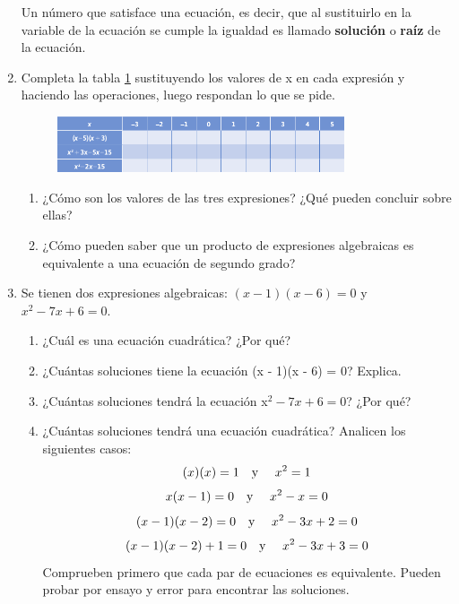 \documentclass[11pt]{book}
\begin{document}
\begin{enumerate}
\begin{enumerate}
        \end{enumerate}
        \begin{boxH}
          Un número que satisface una ecuación, es decir, que al sustituirlo en la variable de
          la ecuación se cumple la igualdad es llamado \textbf{solución} o \textbf{raíz} de la ecuación.
        \end{boxH}

        \newpage

  \item Completa la tabla \ref{tab:table01} sustituyendo los valores de x en cada expresión y haciendo las operaciones, luego respondan lo que se pide.

        \begin{figure}[H]
          \centering
          \includegraphics[width=0.8\textwidth]{tabla01.png}
          \label{tab:table01}
        \end{figure}

        \begin{enumerate}
          \item ¿Cómo son los valores de las tres expresiones? ¿Qué pueden concluir sobre ellas?
          \item ¿Cómo pueden saber que un producto de expresiones algebraicas es equivalente a una ecuación de segundo grado?
        \end{enumerate}


  \item Se tienen dos expresiones algebraicas: $(x - 1)(x - 6) = 0$ y $x^2 - 7x + 6 = 0$.

        \begin{enumerate}
          \item ¿Cuál es una ecuación cuadrática? ¿Por qué?
          \item ¿Cuántas soluciones tiene la ecuación (x - 1)(x - 6) = 0? Explica.
          \item ¿Cuántas soluciones tendrá la ecuación x$^2 - 7x + 6 = 0$? ¿Por qué?
          \item ¿Cuántas soluciones tendrá una ecuación cuadrática?
                Analicen los siguientes casos:
                \[(x)(x) = 1 \text{\quad y \quad} x^2 = 1\]
                \[x(x - 1) = 0 \text{\quad y \quad}x^2 - x = 0\]
                \[(x - 1)(x - 2) = 0 \text{\quad y \quad} x^2 - 3x + 2 = 0\]
                \[(x - 1)(x - 2) + 1 = 0 \text{\quad y \quad} x^2 - 3x + 3 = 0\]
                Comprueben primero que cada par de ecuaciones es equivalente. Pueden probar por ensayo y error para
                encontrar las soluciones.\\
        \end{enumerate}
\end{enumerate}
\end{document}
